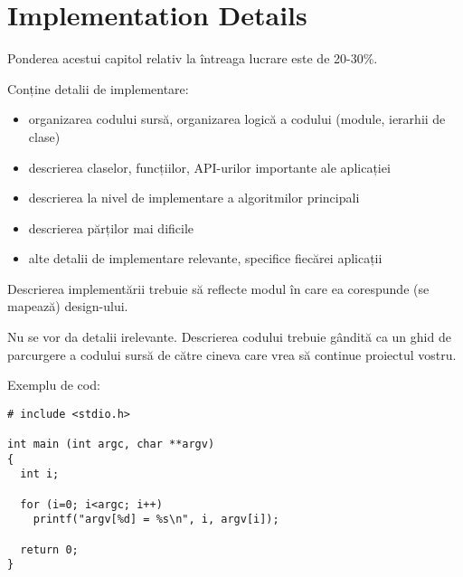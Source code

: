 \chapter{Implementation Details}
\label{cap:implementare}


Ponderea acestui capitol relativ la întreaga lucrare este de 20-30\%.

Conține detalii de implementare: 
\begin{itemize}
  \item organizarea codului sursă, organizarea logică a codului (module, ierarhii de clase)
  \item descrierea claselor, funcțiilor, API-urilor importante ale aplicației
  \item descrierea la nivel de implementare a algoritmilor principali
  \item descrierea părților mai dificile
  \item alte detalii de implementare relevante, specifice fiecărei aplicații
\end{itemize}

Descrierea implementării trebuie să reflecte modul în care ea corespunde (se mapează) design-ului. 

Nu se vor da detalii irelevante. Descrierea codului trebuie gândită ca un ghid de parcurgere a codului sursă de către cineva care vrea să continue proiectul vostru. 

Exemplu de cod:
\lstset{language=C,frame=single, showstringspaces=false}
\begin{lstlisting}
# include <stdio.h>
  
int main (int argc, char **argv)
{
  int i;
    
  for (i=0; i<argc; i++)
    printf("argv[%d] = %s\n", i, argv[i]);
    
  return 0;
}
\end{lstlisting}
